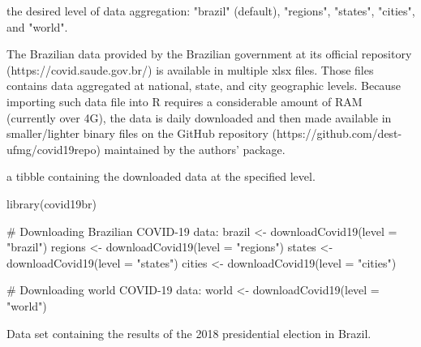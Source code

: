 \documentclass[letterpaper]{book}
\begin{document}
%
\begin{Arguments}
\begin{ldescription}
\item[\code{level}] the desired level of data aggregation:  "brazil" (default), "regions", "states", "cities", and "world".
\end{ldescription}
\end{Arguments}
%
\begin{Details}\relax
The Brazilian data provided by the Brazilian government at its official repository (https://covid.saude.gov.br/) is available in multiple xlsx files. Those files contains data aggregated at national, state, and city geographic levels.  Because importing such data file into R requires a considerable amount of RAM (currently over 4G), the data is daily downloaded and then made available in smaller/lighter binary files on the GitHub repository (https://github.com/dest-ufmg/covid19repo) maintained by the authors' package.
\end{Details}
%
\begin{Value}
a tibble containing the downloaded data at the specified level.
\end{Value}
%
\begin{Examples}
\begin{ExampleCode}

library(covid19br)

# Downloading Brazilian COVID-19 data:
brazil <- downloadCovid19(level = "brazil")
regions <- downloadCovid19(level = "regions")
states <- downloadCovid19(level = "states")
cities <- downloadCovid19(level = "cities")

# Downloading world COVID-19 data:
world <- downloadCovid19(level = "world")


\end{ExampleCode}
\end{Examples}
%
\begin{Description}\relax
Data set containing the results of the 2018 presidential election in Brazil.
\end{Description}
%
\end{document}
